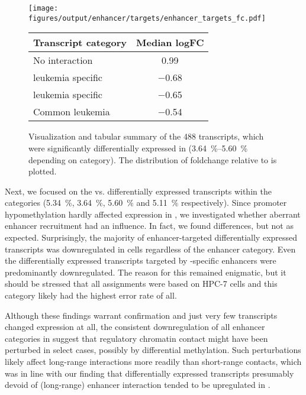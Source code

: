 \begin{figure}[!bh]
	\begin{minipage}{0.55\textwidth}
		\texttt{[image: figures/output/enhancer/targets/enhancer\_targets\_fc.pdf]} 
	\end{minipage}
	\begin{minipage}{0.45\textwidth}
		\begin{tabular}{>{\raggedright}p{3.4cm}c}
			\textbf{Transcript category} & \textbf{Median logFC}  \\
			\hline
			No interaction & \num{0.99} \\
			\dnmtwt \kitpos leukemia specific & \num{-0.68} \\
			\dnmtchip \kitpos leukemia specific & \num{-0.65}  \\
			Common \kitpos leukemia & \num{-0.54} \\
			\hline
		\end{tabular}
		\vspace{2em}
	\end{minipage}
	\caption{Visualization and tabular summary of the \num{488} transcripts, which were significantly differentially expressed in \dnmtchip (\SIrange{3.64}{5.60}{\percent} depending on category). The distribution of foldchange relative to \dnmtwt is plotted.}
	\label{fig:enhancers:target_fc}
\end{figure}

Next, we focused on the \dnmtchip vs. \dnmtwt differentially expressed transcripts within the categories (\SI{5.34}{\percent}, \SI{3.64}{\percent}, \SI{5.60}{\percent} and \SI{5.11}{\percent} respectively). Since promoter hypomethylation hardly affected expression in \dnmtchip {}, we investigated whether aberrant enhancer recruitment had an influence. In fact, we found differences, but not as expected. Surprisingly, the majority of enhancer-targeted differentially expressed transcripts was downregulated in \dnmtchip \kithi cells regardless of the enhancer category. Even the differentially expressed transcripts targeted by \dnmtchip-specific enhancers were predominantly downregulated. The reason for this remained enigmatic, but it should be stressed that all assignments were based on HPC-7 cells and this category likely had the highest error rate of all.

Although these findings warrant confirmation and just very few transcripts changed expression at all, the consistent downregulation of all enhancer categories in \dnmtchip suggest that regulatory chromatin contact might have been perturbed in select cases, possibly by differential methylation. Such perturbations likely affect long-range interactions more readily than short-range contacts\cite{Wang2012b,Ito2013,Kang2015,Whalen2016}, which was in line with our finding that differentially expressed transcripts presumably devoid of (long-range) enhancer interaction tended to be upregulated in \dnmtchip {}. 

